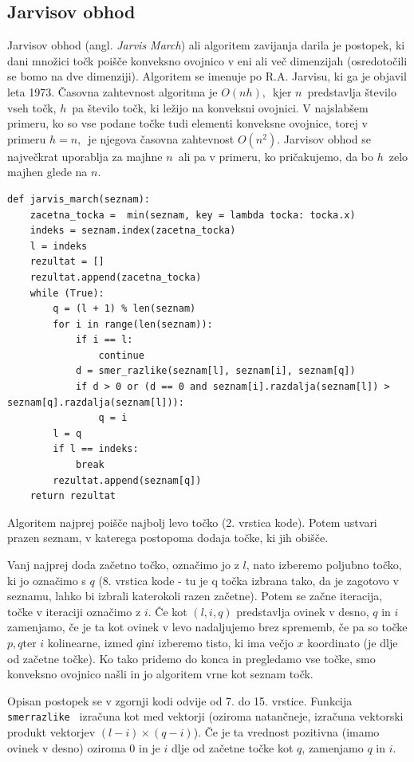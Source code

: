 \documentclass[a4paper]{article}
\begin{document}
\subsection{Jarvisov obhod}
Jarvisov obhod (angl. \textit{Jarvis March}) ali algoritem zavijanja darila je postopek, ki dani množici točk poišče konveksno ovojnico v eni ali več dimenzijah (osredotočili se 
bomo na dve dimenziji). Algoritem se imenuje po R.A. Jarvisu, ki ga je objavil leta 1973. Časovna zahtevnost algoritma je $O(nh),$~kjer $n$~predstavlja število vseh točk, $h$~pa 
število točk, ki ležijo na konveksni ovojnici. V najslabšem primeru, ko so vse podane točke tudi elementi konveksne ovojnice, torej v primeru $h = n,$~je njegova časovna zahtevnost 
$O(n^2)$. Jarvisov obhod se največkrat uporablja za majhne $n$~ali pa v primeru, ko pričakujemo, da bo $h$~zelo majhen glede na $n$.

\begin{lstlisting}
def jarvis_march(seznam):
    zacetna_tocka =  min(seznam, key = lambda tocka: tocka.x)
    indeks = seznam.index(zacetna_tocka) 
    l = indeks
    rezultat = []
    rezultat.append(zacetna_tocka)
    while (True):
        q = (l + 1) % len(seznam)      
        for i in range(len(seznam)):
            if i == l:
                continue
            d = smer_razlike(seznam[l], seznam[i], seznam[q])
            if d > 0 or (d == 0 and seznam[i].razdalja(seznam[l]) > seznam[q].razdalja(seznam[l])):
                q = i
        l = q
        if l == indeks:
            break    
        rezultat.append(seznam[q])
    return rezultat
\end{lstlisting}

Algoritem najprej poišče najbolj levo točko (2. vrstica kode). Potem ustvari prazen seznam, v katerega postopoma dodaja točke, ki jih obišče. 

Vanj najprej doda začetno točko, označimo jo z $l$, nato izberemo poljubno točko, ki jo označimo s $q$ (8. vrstica kode - tu je q točka izbrana tako, da je zagotovo v seznamu, 
lahko bi izbrali katerokoli razen začetne). Potem se začne iteracija, točke v iteraciji označimo z $i$. Če kot $(l,i,q)$ predstavlja ovinek v desno, $q$ in $i$ zamenjamo,
če je ta kot ovinek v levo nadaljujemo brez sprememb, če pa so točke $p,q\text{ter~}i$ kolinearne, izmed $q \text{in}i$ izberemo tisto, ki ima večjo $x$ koordinato
(je dlje od začetne točke). Ko tako pridemo do konca in pregledamo vse točke, smo konveksno ovojnico našli in jo algoritem vrne kot seznam točk. 

Opisan postopek se v zgornji kodi odvije od 7. do 15. vrstice. Funkcija \texttt{ smer\textunderscore razlike } izračuna kot med vektorji 
(oziroma natančneje, izračuna vektorski produkt vektorjev $(l - i)\times(q - i)$). Če je ta vrednost pozitivna (imamo ovinek v desno) oziroma 0 in je $i$ dlje od začetne točke kot $q$, zamenjamo $q$ in $i$. 
\end{document}
